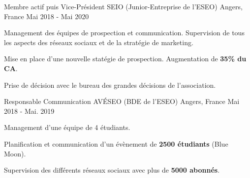 

\begin{cventries}

  \cventry
    {Membre actif puis Vice-Président} %
    {SEIO (Junior-Entreprise de l'ESEO)} %
    {Angers, France} %
    {Mai 2018 - Mai 2020} %
    {
      \begin{cvitems} %
        \item {Management des équipes de prospection et communication. Supervision de tous les aspects des réseaux sociaux et de la stratégie de marketing.}
        \item {Mise en place d'une nouvelle statégie de prospection. Augmentation de \textbf{35\% du CA}.}
        \item {Prise de décision avec le bureau des grandes décisions de l'association.}
      \end{cvitems}
    }

  \cventry
    {Responsable Communication} %
    {AVÉSEO (BDE de l'ESEO)} %
    {Angers, France} %
    {Mai 2018 - Mai. 2019} %
    {
      \begin{cvitems} %
        \item {Management d'une équipe de 4 étudiants.}
        \item {Planification et communication d'un évènement de \textbf{2500 étudiants} (Blue Moon).}
        \item {Supervision des différents réseaux sociaux avec plus de \textbf{5000 abonnés}.}
      \end{cvitems}
    }

\end{cventries}
